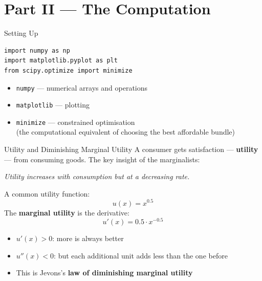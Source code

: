 \documentclass[aspectratio=169, 10pt]{beamer}
\begin{document}
\section{Part II --- The Computation}

\begin{frame}[fragile]{Setting Up}
\begin{lstlisting}
import numpy as np
import matplotlib.pyplot as plt
from scipy.optimize import minimize
\end{lstlisting}
\vspace{0.5em}
\begin{itemize}
  \item \texttt{numpy} --- numerical arrays and operations
  \item \texttt{matplotlib} --- plotting
  \item \texttt{minimize} --- constrained optimisation\\
        (the computational equivalent of choosing the best affordable bundle)
\end{itemize}
\end{frame}

\begin{frame}{Utility and Diminishing Marginal Utility}
A consumer gets satisfaction --- \textbf{utility} --- from consuming goods.
The key insight of the marginalists:
\vspace{0.3em}
\begin{center}
\textit{Utility increases with consumption but at a \alert{decreasing rate}.}
\end{center}
\vspace{0.3em}
A common utility function:
\[
  u(x) = x^{0.5}
\]
The \textbf{marginal utility} is the derivative:
\[
  u'(x) = 0.5 \cdot x^{-0.5}
\]
\vspace{0.3em}
\begin{itemize}
  \item $u'(x) > 0$: more is always better
  \item $u''(x) < 0$: but each additional unit adds less than the one before
  \item This is Jevons's \textbf{law of diminishing marginal utility}
\end{itemize}
\end{frame}
\end{document}

